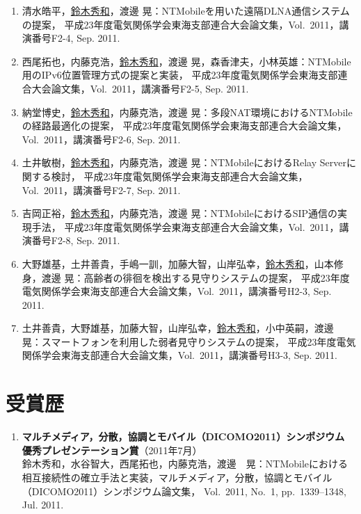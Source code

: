 \begin{enumerate}
\item 清水皓平，\underline{鈴木秀和}，渡邊 晃：NTMobileを用いた遠隔DLNA通信システムの提案，
平成23年度電気関係学会東海支部連合大会論文集，Vol.~2011，講演番号F2-4, Sep. 2011.

\item 西尾拓也，内藤克浩，\underline{鈴木秀和}，渡邊 晃，森香津夫，小林英雄：NTMobile用のIPv6位置管理方式の提案と実装，
平成23年度電気関係学会東海支部連合大会論文集，Vol.~2011，講演番号F2-5, Sep. 2011.

\item 納堂博史，\underline{鈴木秀和}，内藤克浩，渡邊 晃：多段NAT環境におけるNTMobileの経路最適化の提案，
平成23年度電気関係学会東海支部連合大会論文集，Vol.~2011，講演番号F2-6, Sep. 2011.

\item 土井敏樹，\underline{鈴木秀和}，内藤克浩，渡邊 晃：NTMobileにおけるRelay Serverに関する検討，
平成23年度電気関係学会東海支部連合大会論文集，Vol.~2011，講演番号F2-7, Sep. 2011.

\item 吉岡正裕，\underline{鈴木秀和}，内藤克浩，渡邊 晃：NTMobileにおけるSIP通信の実現手法，
平成23年度電気関係学会東海支部連合大会論文集，Vol.~2011，講演番号F2-8, Sep. 2011.

\item 大野雄基，土井善貴，手嶋一訓，加藤大智，山岸弘幸，\underline{鈴木秀和}，山本修身，渡邊 晃：高齢者の徘徊を検出する見守りシステムの提案，
平成23年度電気関係学会東海支部連合大会論文集，Vol.~2011，講演番号H2-3, Sep. 2011.

\item 土井善貴，大野雄基，加藤大智，山岸弘幸，\underline{鈴木秀和}，小中英嗣，渡邊 晃：スマートフォンを利用した弱者見守りシステムの提案，
平成23年度電気関係学会東海支部連合大会論文集，Vol.~2011，講演番号H3-3, Sep. 2011.
\end{enumerate}

\section*{受賞歴}
\begin{enumerate}
\item {\bf マルチメディア，分散，協調とモバイル（DICOMO2011）シンポジウム 優秀プレゼンテーション賞}（2011年7月）\\
鈴木秀和，水谷智大，西尾拓也，内藤克浩，渡邊　晃：NTMobileにおける相互接続性の確立手法と実装，マルチメディア，分散，協調とモバイル（DICOMO2011）シンポジウム論文集，
Vol.~2011, No.~1, pp.\ 1339--1348, Jul. 2011.
\end{enumerate}

